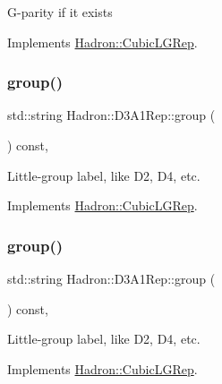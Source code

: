 G-\/parity if it exists 

Implements \mbox{\hyperlink{structHadron_1_1CubicLGRep_ace26f7b2d55e3a668a14cb9026da5231}{Hadron\+::\+Cubic\+L\+G\+Rep}}.

\mbox{\label{structHadron_1_1D3A1Rep_a03d8ecc85c64ea7c17e55196d73174f4}} 
\subsubsection{\texorpdfstring{group()}{group()}\hspace{0.1cm}{\footnotesize\ttfamily [1/3]}}
{\footnotesize\ttfamily std\+::string Hadron\+::\+D3\+A1\+Rep\+::group (\begin{DoxyParamCaption}{ }\end{DoxyParamCaption}) const\hspace{0.3cm}{\ttfamily [inline]}, {\ttfamily [virtual]}}

Little-\/group label, like D2, D4, etc. 

Implements \mbox{\hyperlink{structHadron_1_1CubicLGRep_a9bdb14b519a611d21379ed96a3a9eb41}{Hadron\+::\+Cubic\+L\+G\+Rep}}.

\mbox{\label{structHadron_1_1D3A1Rep_a03d8ecc85c64ea7c17e55196d73174f4}} 
\subsubsection{\texorpdfstring{group()}{group()}\hspace{0.1cm}{\footnotesize\ttfamily [2/3]}}
{\footnotesize\ttfamily std\+::string Hadron\+::\+D3\+A1\+Rep\+::group (\begin{DoxyParamCaption}{ }\end{DoxyParamCaption}) const\hspace{0.3cm}{\ttfamily [inline]}, {\ttfamily [virtual]}}

Little-\/group label, like D2, D4, etc. 

Implements \mbox{\hyperlink{structHadron_1_1CubicLGRep_a9bdb14b519a611d21379ed96a3a9eb41}{Hadron\+::\+Cubic\+L\+G\+Rep}}.

\mbox{\label{structHadron_1_1D3A1Rep_a03d8ecc85c64ea7c17e55196d73174f4}} 
